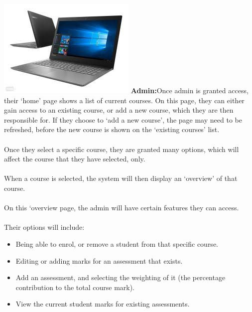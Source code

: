 \documentclass[paper=a4, fontsize=11pt]{scrartcl}
\numberwithin{equation}{section}		%
\numberwithin{figure}{section}			%
\numberwithin{table}{section}				%
\begin{document}
\includegraphics[width = \textwidth]{img.jpeg}
\textbf{Admin:}Once admin is granted access, their ‘home’ page shows a list of current courses. On this page, they can either gain access to an existing course, or add a new course, which they are then responsible for. If they choose to ‘add a new course’, the page may need to be refreshed, before the new course is shown on the ‘existing courses’ list.\\\\Once they select a specific course, they are granted many options, which will affect the course that they have selected, only.\\\\When a course is selected, the system will then display an ‘overview’ of that course.\\\\On this ‘overview page, the admin will have certain features they can access.\\\\ Their options will include:
\begin{itemize}
\item Being able to enrol, or remove a student from that specific course.
\item Editing or adding marks for an assessment that exists.
\item Add an assessment, and selecting the weighting of it (the percentage contribution to the total course mark).
\item View the current student marks for existing assessments.
\end{itemize}
\end{document}
